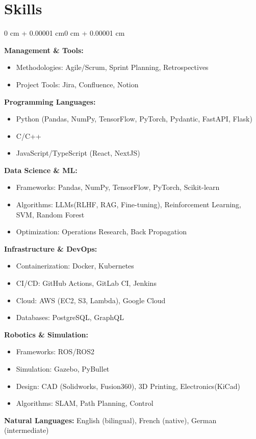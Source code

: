 \documentclass[10pt, letterpaper]{article}
\newenvironment{onecolentry}{
    \begin{adjustwidth}{0 cm + 0.00001 cm}{0 cm + 0.00001 cm}
}{
    \end{adjustwidth}
}
\begin{document}
    \section{Skills}
    \begin{onecolentry}
        \textbf{Management \& Tools:}
        \begin{itemize}[noitemsep,topsep=0pt]
            \item Methodologies: Agile/Scrum, Sprint Planning, Retrospectives
            \item Project Tools: Jira, Confluence, Notion
        \end{itemize}

        \textbf{Programming Languages:} 
        \begin{itemize}[noitemsep,topsep=0pt]
            \item Python (Pandas, NumPy, TensorFlow, PyTorch, Pydantic, FastAPI, Flask)
            \item C/C++
            \item JavaScript/TypeScript (React, NextJS)
        \end{itemize}
        
        \textbf{Data Science \& ML:} 
        \begin{itemize}[noitemsep,topsep=0pt]
            \item Frameworks: Pandas, NumPy, TensorFlow, PyTorch, Scikit-learn
            \item Algorithms: LLMs(RLHF, RAG, Fine-tuning), Reinforcement Learning, SVM, Random Forest
            \item Optimization: Operations Research, Back Propagation
        \end{itemize}
        
        \textbf{Infrastructure \& DevOps:}
        \begin{itemize}[noitemsep,topsep=0pt]
            \item Containerization: Docker, Kubernetes
            \item CI/CD: GitHub Actions, GitLab CI, Jenkins
            \item Cloud: AWS (EC2, S3, Lambda), Google Cloud
            \item Databases: PostgreSQL, GraphQL
        \end{itemize}
        
        \textbf{Robotics \& Simulation:}
        \begin{itemize}[noitemsep,topsep=0pt]
            \item Frameworks: ROS/ROS2
            \item Simulation: Gazebo, PyBullet
            \item Design: CAD (Solidworks, Fusion360), 3D Printing, Electronics(KiCad)
            \item Algorithms: SLAM, Path Planning, Control
        \end{itemize}
        
        \textbf{Natural Languages:} English (bilingual), French (native), German (intermediate)
    \end{onecolentry}
\end{document}
